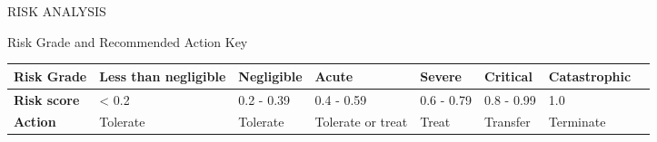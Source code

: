 \documentclass{article}
\begin{document}
\begin{section}{RISK ANALYSIS}
		\begin{subsection}{Risk Grade and Recommended Action Key}
			\begin{tabularx}{\linewidth}{| X | X | X | X | X | X | X | X |}
				\hline
				\bf{Risk Grade} & Less than negligible & Negligible & Acute & Severe & Critical & Catastrophic \\
				\hline
				\bf{Risk score} & < 0.2 & 0.2 - 0.39 & 0.4 - 0.59 & 0.6 - 0.79 & 0.8 - 0.99 & 1.0 \\
				\hline
				\bf{Action} & Tolerate & Tolerate & Tolerate or treat & Treat & Transfer & Terminate \\
				\hline
			\end{tabularx}
		\end{subsection}
	\end{section}
	
\end{document}
